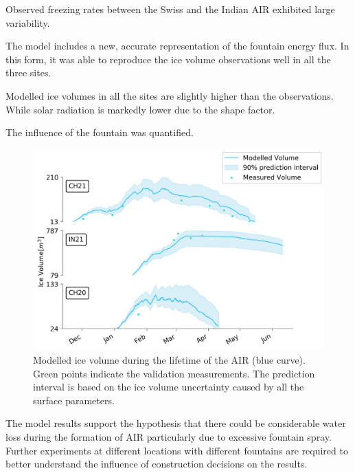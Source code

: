 \documentclass[utf8]{frontiersSCNS} %
\begin{document}
Observed freezing rates between the Swiss and the Indian AIR exhibited large variability.

The model includes a new, accurate representation of the fountain energy flux. In this form, it was able to reproduce the
ice volume observations well in all the three sites. 

Modelled ice volumes in all the sites are slightly higher than the observations. While solar radiation is markedly lower
due to the shape factor.

The influence of the fountain was quantified. 

\begin{figure} 
    \begin{center} 
    \includegraphics[width=\linewidth]{Figures/icev_results.jpg} 
\end{center}
  \caption{Modelled ice volume during the lifetime of the AIR (blue curve). Green points indicate the validation
  measurements. The prediction interval is based on the ice volume uncertainty caused by all the surface parameters.  } 
\label{fig:results} 
\end{figure}

The model results support the hypothesis that there could be considerable water loss during the formation of AIR
particularly due to excessive fountain spray. Further experiments at different locations with different fountains are
required to better understand the influence of construction decisions on the results. 

\end{document}

